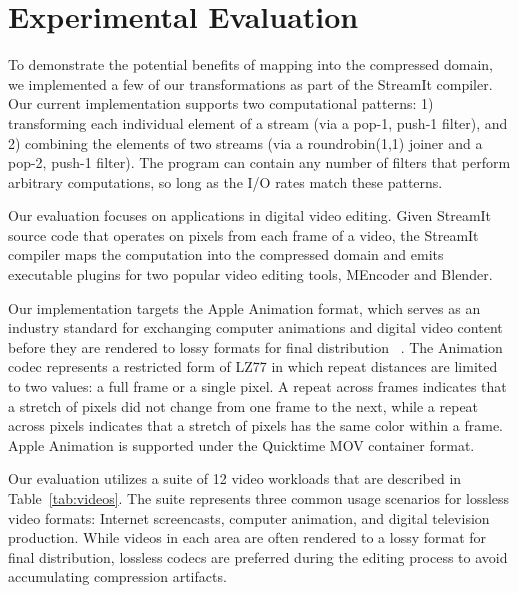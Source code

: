 \section{Experimental Evaluation}

To demonstrate the potential benefits of mapping into the compressed
domain, we implemented a few of our transformations as part of the
StreamIt compiler.  Our current implementation supports two
computational patterns: 1) transforming each individual element of a
stream (via a pop-1, push-1 filter), and 2) combining the elements of
two streams (via a roundrobin(1,1) joiner and a pop-2, push-1 filter).
The program can contain any number of filters that perform arbitrary
computations, so long as the I/O rates match these patterns.  

Our evaluation focuses on applications in digital video editing.
Given StreamIt source code that operates on pixels from each frame of
a video, the StreamIt compiler maps the computation into the
compressed domain and emits executable plugins for two popular video
editing tools, MEncoder and Blender.

Our implementation targets the Apple Animation format, which serves as
an industry standard for exchanging computer animations and digital
video content before they are rendered to lossy formats for final
distribution~\cite[p.~106]{adobe-anim}\cite[p.~284]{harrington-anim}
\cite[p.~367]{long-anim}\cite[p.~280]{pogue-anim}.  The Animation
codec represents a restricted form of LZ77 in which repeat distances
are limited to two values: a full frame or a single pixel.  A repeat
across frames indicates that a stretch of pixels did not change from
one frame to the next, while a repeat across pixels indicates that a
stretch of pixels has the same color within a frame.  Apple Animation
is supported under the Quicktime MOV container format.

Our evaluation utilizes a suite of 12 video workloads that are
described in Table~\ref{tab:videos}.  The suite represents three
common usage scenarios for lossless video formats: Internet
screencasts, computer animation, and digital television production.
While videos in each area are often rendered to a lossy format for
final distribution, lossless codecs are preferred during the editing
process to avoid accumulating compression artifacts.

